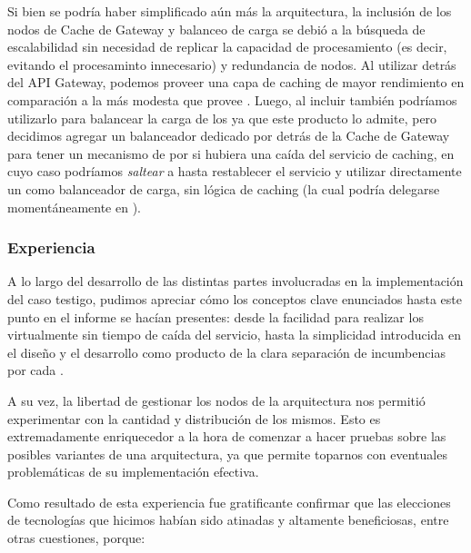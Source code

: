 Si bien se podría haber simplificado aún más la arquitectura, la inclusión de los nodos de Cache de Gateway y balanceo de carga se debió a la búsqueda de escalabilidad sin necesidad de replicar la capacidad de procesamiento (es decir, evitando el procesaminto innecesario) y redundancia de nodos. Al utilizar  detrás del API Gateway, podemos proveer una capa de caching de mayor rendimiento en comparación a la más modesta que provee . Luego, al incluir  también podríamos utilizarlo para balancear la carga de los  ya que este producto lo admite, pero decidimos agregar un balanceador dedicado por detrás de la Cache de Gateway para tener un mecanismo de  por si hubiera una caída del servicio de caching, en cuyo caso podríamos \textit{saltear} a  hasta restablecer el servicio y utilizar directamente un  como balanceador de carga, sin lógica de caching (la cual podría delegarse momentáneamente en ).

\subsubsection{Experiencia}
\label{caso-testigo:experiencia}

A lo largo del desarrollo de las distintas partes involucradas en la implementación del caso testigo, pudimos apreciar cómo los conceptos clave enunciados hasta este punto en el informe se hacían presentes: desde la facilidad para realizar los  virtualmente sin tiempo de caída del servicio, hasta la simplicidad introducida en el diseño y el desarrollo como producto de la clara separación de incumbencias por cada .

A su vez, la libertad de gestionar los nodos de la arquitectura nos permitió experimentar con la cantidad y distribución de los mismos. Esto es extremadamente enriquecedor a la hora de comenzar a hacer pruebas sobre las posibles variantes de una arquitectura, ya que permite toparnos con eventuales problemáticas de su implementación efectiva.

Como resultado de esta experiencia fue gratificante confirmar que las elecciones de tecnologías que hicimos habían sido atinadas y altamente beneficiosas, entre otras cuestiones, porque:


